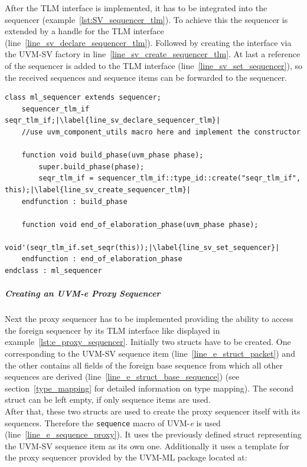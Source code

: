 After the TLM interface is implemented, it has to be integrated into the sequencer (example~\ref{lst:SV_sequencer_tlm}). To achieve this the sequencer is extended by a handle for the TLM interface (line~\ref{line_sv_declare_sequencer_tlm}). Followed by creating the interface via the UVM-SV factory in line~\ref{line_sv_create_sequencer_tlm}. At last a reference of the sequencer is added to the TLM interface (line~\ref{line_sv_set_sequencer}), so the received sequences and sequence items can be forwarded to the sequencer. 
\lstset{language=SystemVerilog, numbers = left, escapechar=|, breaklines=true}
\begin{lstlisting}[frame=htrbl, caption={SystemVerilog: extending the sequencer by a TLM interface},
label={lst:SV_sequencer_tlm}]
class ml_sequencer extends sequencer;
    sequencer_tlm_if seqr_tlm_if;|\label{line_sv_declare_sequencer_tlm}|
    //use uvm_component_utils macro here and implement the constructor

    function void build_phase(uvm_phase phase);
        super.build_phase(phase);
        seqr_tlm_if = sequencer_tlm_if::type_id::create("seqr_tlm_if", this);|\label{line_sv_create_sequencer_tlm}|
    endfunction : build_phase

    function void end_of_elaboration_phase(uvm_phase phase);
        void'(seqr_tlm_if.set_seqr(this));|\label{line_sv_set_sequencer}|
    endfunction : end_of_elaboration_phase
endclass : ml_sequencer
\end{lstlisting}
\subparagraph{Creating an UVM-\textit{e} Proxy Sequencer} 
Next the proxy sequencer has to be implemented providing the ability to access the foreign sequencer by its TLM interface like displayed in example~\ref{lst:e_proxy_sequencer}. Initially two structs have to be created. One corresponding to the UVM-SV sequence item (line~\ref{line_e_struct_packet}) and the other contains all fields of the foreign base sequence from which all other sequences are derived (line~\ref{line_e_struct_base_sequence}) (see section~\ref{type_mapping} for detailed information on type mapping). The second struct can be left empty, if only sequence items are used.\\
After that, these two structs are used to create the proxy sequencer itself with its sequences. Therefore the \lstinline$sequence$ macro of UVM-\textit{e} is used (line~\ref{line_e_sequence_proxy}). It uses the previously defined struct representing the UVM-SV sequence item as its own one. Additionally it uses a template for the proxy sequencer provided by the UVM-ML package located at:
